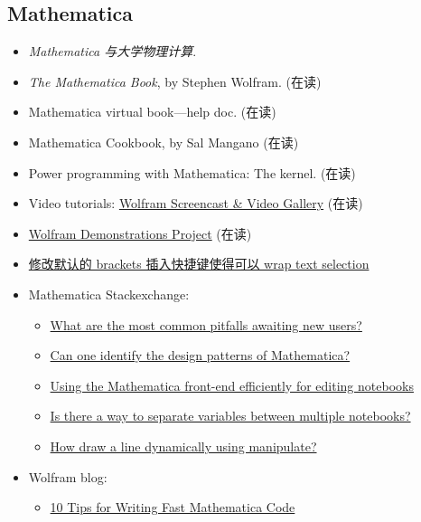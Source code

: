\documentclass{article}
\newcommand{\book}[1]{\textit{#1}}
\begin{document}
\subsection{Mathematica}
\begin{itemize}
    \item \book{Mathematica 与大学物理计算}.
    \item \book{The Mathematica Book}, by Stephen Wolfram. (在读)
    \item Mathematica virtual book---help doc. (在读)
    \item Mathematica Cookbook, by Sal Mangano (在读)
    \item Power programming with Mathematica: The kernel. (在读)
    \item Video tutorials: \href{http://www.wolfram.com/broadcast/}{Wolfram Screencast \&{} Video Gallery} (在读)
    \item \href{http://demonstrations.wolfram.com/}{Wolfram Demonstrations Project} (在读)
    \item \href{http://stoney.sb.org/wordpress/2008/12/adding-a-keyboard-shortcut-to-mathematica-v7/}{修改默认的 brackets 插入快捷键使得可以 wrap text selection}
    \item Mathematica Stackexchange:
        \begin{itemize}
            \item \href{http://mathematica.stackexchange.com/questions/18393/what-are-the-most-common-pitfalls-awaiting-new-users}{What are the most common pitfalls awaiting new users?}
            \item \href{http://mathematica.stackexchange.com/questions/24988/can-one-identify-the-design-patterns-of-mathematica}{Can one identify the design patterns of Mathematica?}
            \item \href{http://mathematica.stackexchange.com/questions/8310/using-the-mathematica-front-end-efficiently-for-editing-notebooks}{Using the Mathematica front-end efficiently for editing notebooks}
            \item \href{http://mathematica.stackexchange.com/questions/853/is-there-a-way-to-separate-variables-between-multiple-notebooks?lq=1}{Is there a way to separate variables between multiple notebooks?}
            \item \href{http://mathematica.stackexchange.com/questions/57656/how-draw-a-line-dynamically-using-manipulate}{How draw a line dynamically using manipulate?}
        \end{itemize}
    \item Wolfram blog:
        \begin{itemize}
            \item \href{http://blog.wolfram.com/2011/12/07/10-tips-for-writing-fast-mathematica-code/}{10 Tips for Writing Fast Mathematica Code}
        \end{itemize}
\end{itemize}
\end{document}
